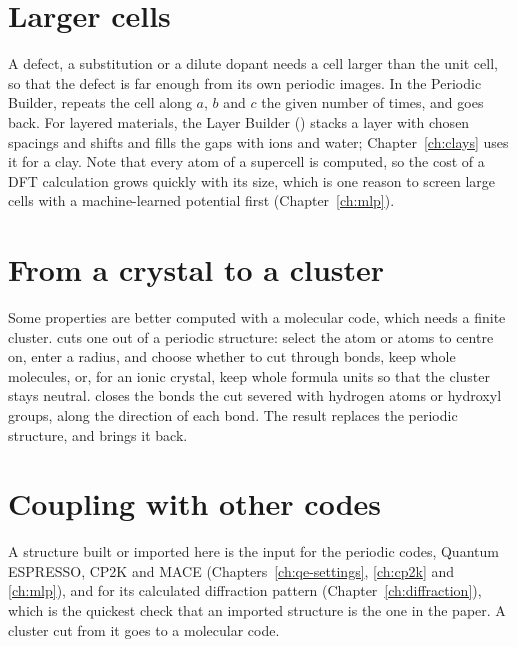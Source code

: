 \section{Larger cells}
A defect, a substitution or a dilute dopant needs a cell larger than the unit cell, so that the defect is far enough from its own periodic images. In the Periodic Builder,  repeats the cell along $a$, $b$ and $c$ the given number of times, and  goes back. For layered materials, the Layer Builder () stacks a layer with chosen spacings and shifts and fills the gaps with ions and water; Chapter~\ref{ch:clays} uses it for a clay. Note that every atom of a supercell is computed, so the cost of a DFT calculation grows quickly with its size, which is one reason to screen large cells with a machine-learned potential first (Chapter~\ref{ch:mlp}).

\section{From a crystal to a cluster}
Some properties are better computed with a molecular code, which needs a finite cluster.  cuts one out of a periodic structure: select the atom or atoms to centre on, enter a radius, and choose whether to cut through bonds, keep whole molecules, or, for an ionic crystal, keep whole formula units so that the cluster stays neutral.  closes the bonds the cut severed with hydrogen atoms or hydroxyl groups, along the direction of each bond. The result replaces the periodic structure, and  brings it back.

\section{Coupling with other codes}
A structure built or imported here is the input for the periodic codes, Quantum ESPRESSO, CP2K and MACE (Chapters~\ref{ch:qe-settings}, \ref{ch:cp2k} and \ref{ch:mlp}), and for its calculated diffraction pattern (Chapter~\ref{ch:diffraction}), which is the quickest check that an imported structure is the one in the paper. A cluster cut from it goes to a molecular code.
